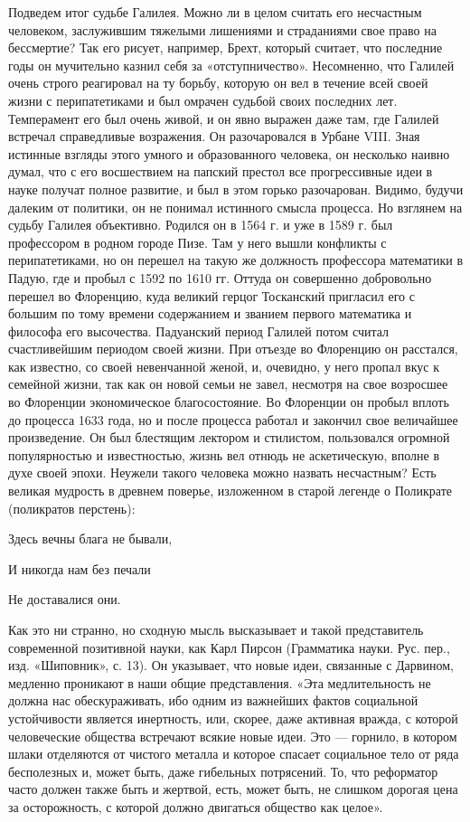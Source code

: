 Подведем итог судьбе Галилея. Можно ли в целом считать его несчастным
человеком, заслужившим тяжелыми лишениями и страданиями свое право на
бессмертие? Так его рисует, например, Брехт, который считает, что последние
годы он мучительно казнил себя за «отступничество». Несомненно, что Галилей
очень строго реагировал на ту борьбу, которую он вел в течение всей своей жизни
с перипатетиками и был омрачен судьбой своих последних лет. Темперамент его
был очень живой, и он явно выражен даже там, где Галилей встречал справедливые
возражения. Он разочаровался в Урбане VIII. Зная истинные взгляды этого умного
и образованного человека, он несколько наивно думал, что с его восшествием на
папский престол все прогрессивные идеи в науке получат полное развитие, и был в
этом горько разочарован. Видимо, будучи далеким от политики, он не понимал
истинного смысла процесса. Но взглянем на судьбу Галилея объективно. Родился он
в 1564 г. и уже в 1589 г. был профессором в родном городе Пизе. Там у него
вышли конфликты с перипатетиками, но он перешел на такую же должность
профессора математики в Падую, где и пробыл с 1592 по 1610 гг. Оттуда он
совершенно добровольно перешел во Флоренцию, куда великий герцог Тосканский
пригласил его с большим по тому времени содержанием и званием первого
математика и философа его высочества. Падуанский период Галилей потом считал
счастливейшим периодом своей жизни. При отъезде во Флоренцию он расстался, как
известно, со своей невенчанной женой, и, очевидно, у него пропал вкус к
семейной жизни, так как он новой семьи не завел, несмотря на свое возросшее во
Флоренции экономическое благосостояние. Во Флоренции он пробыл вплоть до
процесса 1633 года, но и после процесса работал и закончил свое величайшее
произведение. Он был блестящим лектором и стилистом, пользовался огромной
популярностью и известностью, жизнь вел отнюдь не аскетическую, вполне в духе
своей эпохи. Неужели такого человека можно назвать несчастным? Есть великая
мудрость в древнем поверье, изложенном в старой легенде о Поликрате (поликратов
перстень):

Здесь вечны блага не бывали,

И никогда нам без печали

Не доставалися они.

Как это ни странно, но сходную мысль высказывает и такой представитель
современной позитивной науки, как Карл Пирсон (Грамматика науки. Рус. пер.,
изд. «Шиповник», с. 13). Он указывает, что новые идеи, связанные с Дарвином,
медленно проникают в наши общие представления. «Эта медлительность не должна
нас обескураживать, ибо одним из важнейших фактов социальной устойчивости
является инертность, или, скорее, даже активная вражда, с которой человеческие
общества встречают всякие новые идеи. Это --- горнило, в котором шлаки отделяются
от чистого металла и которое спасает социальное тело от ряда бесполезных и,
может быть, даже гибельных потрясений. То, что реформатор часто должен также
быть и жертвой, есть, может быть, не слишком дорогая цена за осторожность, с
которой должно двигаться общество как целое».

